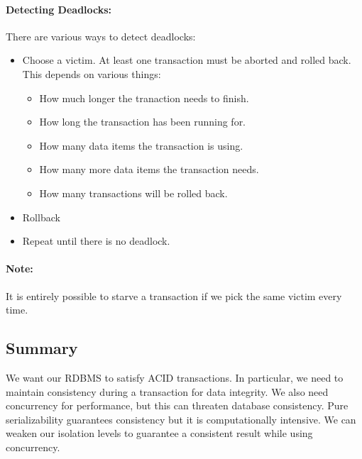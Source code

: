 \documentclass{report}
\begin{document}
\paragraph{Detecting Deadlocks:} There are various ways to detect deadlocks:
\begin{itemize}[label=$\to$]
    \item Choose a victim. At least one transaction must be aborted and rolled
        back. This depends on various things:
        \begin{itemize}[label=$\to$]
            \item How much longer the tranaction needs to finish.
            \item How long the transaction has been running for.
            \item How many data items the transaction is using.
            \item How many more data items the transaction needs.
            \item How many transactions will be rolled back.
        \end{itemize}
    \item Rollback
    \item Repeat until there is no deadlock.
\end{itemize}

\paragraph{Note:} It is entirely possible to starve a transaction if we pick the
same victim every time.

\subsection{Summary}
We want our RDBMS to satisfy ACID transactions. In particular, we need to
maintain consistency during a transaction for data integrity. We also need
concurrency for performance, but this can threaten database consistency. Pure
serializability guarantees consistency but it is computationally intensive. We
can weaken our isolation levels to guarantee a consistent result while using
concurrency.
\end{document}
